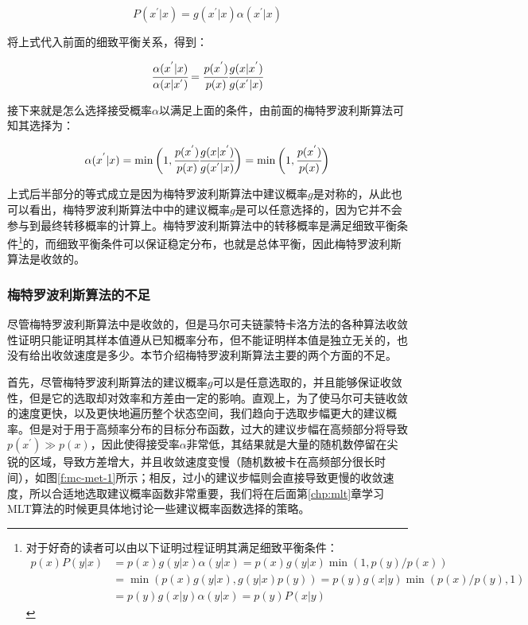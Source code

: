 \begin{equation}
	P(x^{'}|x)=g(x^{'}|x)\alpha(x^{'}|x)
\end{equation}

\noindent 将上式代入前面的细致平衡关系，得到：

\begin{equation}
	 \cfrac{\alpha(x^{'}|x)}{\alpha(x|x^{'})}= \cfrac{p(x^{'})}{p(x)} \cfrac{g(x|x^{'})}{g(x^{'}|x)}
\end{equation}

\noindent 接下来就是怎么选择接受概率$\alpha$以满足上面的条件，由前面的梅特罗波利斯算法可知其选择为：

\begin{equation}
	\alpha(x^{'}|x)=\min \bigg( 1, \cfrac{p(x^{'})}{p(x)} \cfrac{g(x|x^{'})}{g(x^{'}|x)}\bigg)=\min\bigg(1, \cfrac{p(x^{'})}{p(x)}\bigg)
\end{equation}

上式后半部分的等式成立是因为梅特罗波利斯算法中建议概率$g$是对称的，从此也可以看出，梅特罗波利斯算法中中的建议概率$g$是可以任意选择的，因为它并不会参与到最终转移概率的计算上。梅特罗波利斯算法中的转移概率是满足细致平衡条件\footnote{对于好奇的读者可以由以下证明过程证明其满足细致平衡条件：
\begin{equation}
	\begin{aligned}
		p(x)P(y|x)&=p(x)g(y|x)\alpha(y|x)=p(x)g(y|x)\min(1,p(y)/p(x))\\
		&=\min(p(x)g(y|x),g(y|x)p(y))=p(y)g(x|y)\min(p(x)/p(y),1)\\
		&=p(y)g(x|y)\alpha(y|x)=p(y)P(x|y)
	\end{aligned}
\end{equation}
}的，而细致平衡条件可以保证稳定分布，也就是总体平衡，因此梅特罗波利斯算法是收敛的。





\subsubsection{梅特罗波利斯算法的不足}
尽管梅特罗波利斯算法中是收敛的，但是马尔可夫链蒙特卡洛方法的各种算法收敛性证明只能证明其样本值遵从已知概率分布，但不能证明样本值是独立无关的，也没有给出收敛速度是多少。本节介绍梅特罗波利斯算法主要的两个方面的不足。

首先，尽管梅特罗波利斯算法的建议概率$g$可以是任意选取的，并且能够保证收敛性，但是它的选取却对效率和方差由一定的影响。直观上，为了使马尔可夫链收敛的速度更快，以及更快地遍历整个状态空间，我们趋向于选取步幅更大的建议概率。但是对于用于高频率分布的目标分布函数，过大的建议步幅在高频部分将导致$p(x^{'})\gg p(x)$，因此使得接受率$\alpha$非常低，其结果就是大量的随机数停留在尖锐的区域，导致方差增大，并且收敛速度变慢（随机数被卡在高频部分很长时间），如图\ref{f:mc-met-1}所示；相反，过小的建议步幅则会直接导致更慢的收敛速度，所以合适地选取建议概率函数非常重要，我们将在后面第\ref{chp:mlt}章学习MLT算法的时候更具体地讨论一些建议概率函数选择的策略。


